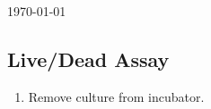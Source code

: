 \documentclass[11pt, oneside]{article}   	%
\begin{document}
\today							%

\subsection{Live/Dead Assay}			%

\begin{enumerate}

\item Remove culture from incubator.


\end{enumerate}
\end{document}
